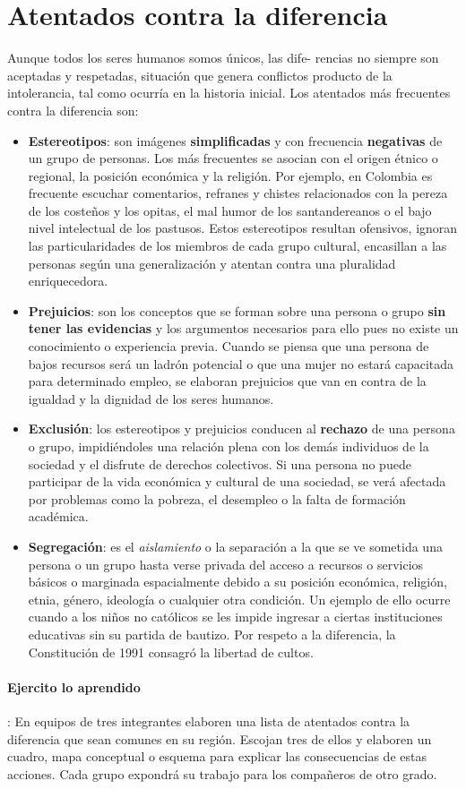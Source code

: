 \documentclass[10pt,twoside]{article}
\begin{document}
\section*{Atentados contra la diferencia}
Aunque todos los seres humanos somos únicos, las dife-
rencias no siempre son aceptadas y respetadas, situación
que genera conflictos producto de la intolerancia, tal como
ocurría en la historia inicial. Los atentados más frecuentes
contra la diferencia son:
\begin{itemize}
\item \textbf{Estereotipos}: son imágenes \textbf{simplificadas} y con frecuencia \textbf{negativas} de un grupo de personas. Los más frecuentes se asocian con el origen étnico o regional, la posición económica y la religión. Por ejemplo, en Colombia es frecuente escuchar comentarios, refranes y chistes relacionados con la pereza de los costeños
y los opitas, el mal humor de los santandereanos o el
bajo nivel intelectual de los pastusos. Estos estereotipos
resultan ofensivos, ignoran las particularidades de
los miembros de cada grupo cultural, encasillan a las
personas según una generalización y atentan contra una
pluralidad enriquecedora.
\item \textbf{Prejuicios}: son los conceptos que se forman sobre una
persona o grupo \textbf{sin tener las evidencias} y los argumentos
necesarios para ello pues no existe un conocimiento o
experiencia previa. Cuando se piensa que una persona de
bajos recursos será un ladrón potencial o que una mujer no
estará capacitada para determinado empleo, se elaboran
prejuicios que van en contra de la igualdad y la dignidad de
los seres humanos.
\item \textbf{Exclusión}: los estereotipos y prejuicios conducen al \textbf{rechazo} de una persona o grupo, impidiéndoles una relación
plena con los demás individuos de la sociedad y el disfrute
de derechos colectivos. Si una persona no puede participar
de la vida económica y cultural de una sociedad, se verá
afectada por problemas como la pobreza, el desempleo o la
falta de formación académica.
\item \textbf{Segregación}: es el \emph{aislamiento} o la separación a la que se ve sometida una persona o un grupo hasta verse privada del acceso a recursos o servicios básicos o marginada espacialmente debido a su posición económica, religión, etnia, género, ideología o cualquier otra condición. Un ejemplo de ello ocurre cuando a los niños no católicos se
les impide ingresar a ciertas instituciones educativas sin su
partida de bautizo. Por respeto a la diferencia, la Constitución de 1991 consagró la libertad de cultos.
\end{itemize}
\paragraph*{Ejercito lo aprendido}: En equipos de tres integrantes elaboren una lista de atentados contra la diferencia que sean comunes en su región. Escojan tres
de ellos y elaboren un cuadro, mapa conceptual o esquema para explicar las consecuencias de estas acciones. Cada grupo expondrá su trabajo para los compañeros de otro grado.
\end{document}
